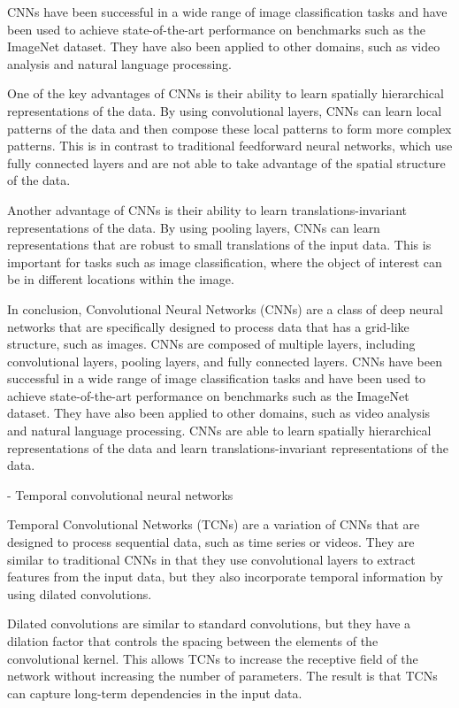 CNNs have been successful in a wide range of image classification tasks and have been used to achieve state-of-the-art performance on benchmarks such as the ImageNet dataset. They have also been applied to other domains, such as video analysis and natural language processing.

One of the key advantages of CNNs is their ability to learn spatially hierarchical representations of the data. By using convolutional layers, CNNs can learn local patterns of the data and then compose these local patterns to form more complex patterns. This is in contrast to traditional feedforward neural networks, which use fully connected layers and are not able to take advantage of the spatial structure of the data.

Another advantage of CNNs is their ability to learn translations-invariant representations of the data. By using pooling layers, CNNs can learn representations that are robust to small translations of the input data. This is important for tasks such as image classification, where the object of interest can be in different locations within the image.

In conclusion, Convolutional Neural Networks (CNNs) are a class of deep neural networks that are specifically designed to process data that has a grid-like structure, such as images. CNNs are composed of multiple layers, including convolutional layers, pooling layers, and fully connected layers. CNNs have been successful in a wide range of image classification tasks and have been used to achieve state-of-the-art performance on benchmarks such as the ImageNet dataset. They have also been applied to other domains, such as video analysis and natural language processing. CNNs are able to learn spatially hierarchical representations of the data and learn translations-invariant representations of the data.

- Temporal convolutional neural networks

Temporal Convolutional Networks (TCNs) are a variation of CNNs that are designed to process sequential data, such as time series or videos. They are similar to traditional CNNs in that they use convolutional layers to extract features from the input data, but they also incorporate temporal information by using dilated convolutions.

Dilated convolutions are similar to standard convolutions, but they have a dilation factor that controls the spacing between the elements of the convolutional kernel. This allows TCNs to increase the receptive field of the network without increasing the number of parameters. The result is that TCNs can capture long-term dependencies in the input data.

